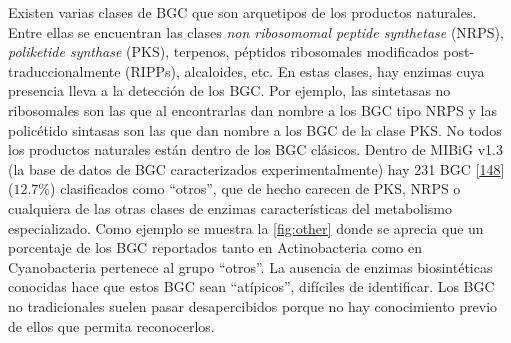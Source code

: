 \documentclass[12pt,twoside]{reedthesis}
\begin{document}
  Existen varias clases de BGC que son arquetipos de los productos
  naturales. Entre ellas se encuentran las clases \emph{non ribosomomal
  peptide synthetase} (NRPS), \emph{poliketide synthase} (PKS), terpenos,
  péptidos ribosomales modificados post-traduccionalmente (RIPPs),
  alcaloides, etc. En estas clases, hay enzimas cuya presencia lleva a la
  detección de los BGC. Por ejemplo, las sintetasas no ribosomales son las
  que al encontrarlas dan nombre a los BGC tipo NRPS y las policétido
  sintasas son las que dan nombre a los BGC de la clase PKS. No todos los
  productos naturales están dentro de los BGC clásicos. Dentro de MIBiG
  v1.3 (la base de datos de BGC caracterizados experimentalmente) hay 231
  BGC {[}\protect\hyperlink{ref-medema_minimum_2015}{148}{]} (\(12.7\%\))
  clasificados como ``otros'', que de hecho carecen de PKS, NRPS o
  cualquiera de las otras clases de enzimas características del
  metabolismo especializado. Como ejemplo se muestra la
  \autoref{fig:other} donde se aprecia que un porcentaje de los BGC
  reportados tanto en Actinobacteria como en Cyanobacteria pertenece al
  grupo ``otros''. La ausencia de enzimas biosintéticas conocidas hace que
  estos BGC sean ``atípicos'', difíciles de identificar. Los BGC no
  tradicionales suelen pasar desapercibidos porque no hay conocimiento
  previo de ellos que permita reconocerlos.
  
\end{document}
